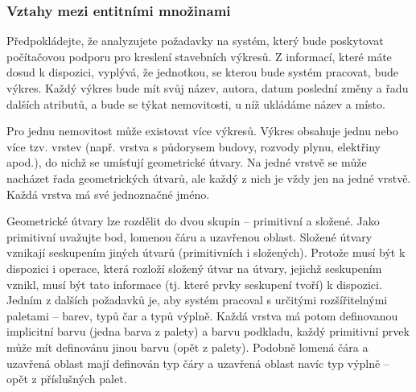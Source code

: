 \documentclass{beamer}
\begin{document}
  \begin{frame}
    \frametitle{Vztahy mezi entitními množinami}
      \scriptsize{
      Předpokládejte, že analyzujete požadavky na systém, který bude poskytovat počítačovou 
      podporu pro kreslení stavebních výkresů. Z informací, které máte dosud k dispozici,
      vyplývá, že jednotkou, se kterou bude systém pracovat, bude výkres. Každý výkres bude
      mít svůj název, autora, datum poslední změny a řadu dalších atributů, a bude se týkat
      nemovitosti, u níž ukládáme název a místo.\par


      \hspace{0.5cm}Pro jednu nemovitost může existovat více výkresů. Výkres obsahuje jednu nebo více tzv.
      vrstev (např. vrstva s půdorysem budovy, rozvody plynu, elektřiny apod.), do nichž se
      umísťují geometrické útvary. Na jedné vrstvě se může nacházet řada geometrických útvarů,
      ale každý z nich je vždy jen na jedné vrstvě. Každá vrstva má své jednoznačné jméno.\par

  
      \hspace{0.5cm}Geometrické útvary lze rozdělit do dvou skupin -- primitivní a složené. Jako primitivní
      uvažujte bod, lomenou čáru a uzavřenou oblast. Složené útvary vznikají seskupením jiných
      útvarů (primitivních i složených). Protože musí být k dispozici i operace, která rozloží
      složený útvar na útvary, jejichž seskupením vznikl, musí být tato informace (tj. které
      prvky seskupení tvoří) k dispozici. Jedním z dalších požadavků je, aby systém pracoval
      s určitými rozšířitelnými paletami -- barev, typů čar a typů výplně. Každá vrstva má
      potom definovanou implicitní barvu (jedna barva  z  palety) a barvu podkladu, každý
      primitivní prvek může mít definovánu jinou barvu (opět z palety). Podobně lomená čára
      a uzavřená oblast mají definován typ čáry a uzavřená oblast navíc typ výplně – opět
      z příslušných palet.\par}
  \end{frame}
\end{document}
